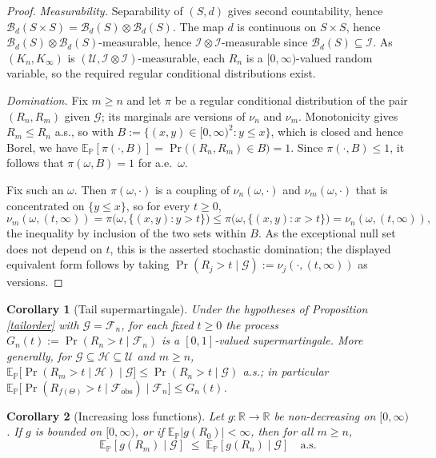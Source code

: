 \documentclass{article}
\newcommand{\E}{\mathbb{E}_{\mathbb{P}}}
\newcommand{\F}{\mathcal{F}}
\newcommand{\G}{\mathcal{G}}
\newcommand{\I}{\mathcal{I}}
\newcommand{\U}{\mathcal{U}}
\newcommand{\1}{\mathbbm{1}}
\newtheorem{cor}{Corollary}
\begin{document}
\begin{proof}
\textit{Measurability.} Separability of $(S,d)$ gives second countability, hence
$\mathcal{B}_d(S\times S)=\mathcal{B}_d(S)\otimes\mathcal{B}_d(S)$. The map $d$ is continuous on
$S\times S$, hence $\mathcal{B}_d(S)\otimes\mathcal{B}_d(S)$-measurable, hence
$\I\otimes\I$-measurable since $\mathcal{B}_d(S)\subseteq\I$. As $(K_n,K_\infty)$ is
$(\U,\I\otimes\I)$-measurable, each $R_n$ is a $[0,\infty)$-valued random variable, so the required
regular conditional distributions exist.

\textit{Domination.} Fix $m\ge n$ and let $\pi$ be a regular conditional distribution of the pair
$(R_n,R_m)$ given $\G$; its marginals are versions of $\nu_n$ and $\nu_m$. Monotonicity gives
$R_m\le R_n$ a.s., so with $B:=\{(x,y)\in[0,\infty)^2:y\le x\}$, which is closed and hence Borel, we
have $\E[\pi(\cdot,B)]=\Pr\big((R_n,R_m)\in B\big)=1$. Since $\pi(\cdot,B)\le1$, it follows that
$\pi(\omega,B)=1$ for a.e.\ $\omega$.

Fix such an $\omega$. Then $\pi(\omega,\cdot)$ is a coupling of $\nu_n(\omega,\cdot)$ and
$\nu_m(\omega,\cdot)$ that is concentrated on $\{y\le x\}$, so for every $t\ge0$,
\[
\nu_m(\omega,(t,\infty))=\pi\big(\omega,\{(x,y):y>t\}\big)
\le\pi\big(\omega,\{(x,y):x>t\}\big)=\nu_n(\omega,(t,\infty)),
\]
the inequality by inclusion of the two sets within $B$. As the exceptional null set does not depend
on $t$, this is the asserted stochastic domination; the displayed equivalent form follows by taking
$\Pr(R_j>t\mid\G):=\nu_j(\cdot,(t,\infty))$ as versions.
\end{proof}

\begin{cor}[Tail supermartingale]
\label{tailsupermart}
Under the hypotheses of Proposition \ref{tailorder} with $\G=\F_n$, for each fixed $t\ge0$ the
process $G_n(t):=\Pr(R_n>t\mid\F_n)$ is a $[0,1]$-valued supermartingale. More generally, for
$\mathcal{G}\subseteq\mathcal{H}\subseteq\mathcal{U}$ and $m\ge n$,
$\E\big[\Pr(R_m>t\mid\mathcal{H})\mid\mathcal{G}\big]\le\Pr(R_n>t\mid\mathcal{G})$ a.s.; in particular
$\E\big[\Pr(R_{f(\Theta)}>t\mid\F_{\mathrm{obs}})\mid\F_n\big]\le G_n(t)$.
\end{cor}

\begin{cor}[Increasing loss functions]
\label{tailloss}
Let $g:\mathbb R\to\mathbb R$ be non-decreasing on $[0,\infty)$. If $g$ is bounded on $[0,\infty)$, or if $\E|g(R_0)|<\infty$, then for all
$m\ge n$,
\[
\E[g(R_m)\mid\G]\;\le\;\E[g(R_n)\mid\G]\quad\text{a.s.}
\]
\end{cor}
\end{document}
